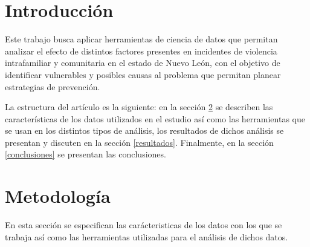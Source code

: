 \documentclass[final,5p,times]{elsarticle}
\begin{document}
\begin{frontmatter}
\begin{keyword}



\end{keyword}

\end{frontmatter}


\section{Introducci\'on} \label{intro}

Este trabajo busca aplicar herramientas de ciencia de datos que permitan analizar el efecto de distintos factores presentes en incidentes de violencia intrafamiliar y comunitaria en el estado de Nuevo Le\'on, con el objetivo de identificar vulnerables y posibles causas al problema que permitan planear estrategias de prevenci\'on.

La estructura del art\'iculo es la siguiente: en la secci\'on \ref{metodologia} se describen las caracter\'isticas de los datos utilizados en el estudio as\'i como las herramientas que se usan en los distintos tipos de an\'alisis, los resultados de dichos an\'alisis se presentan y discuten en la secci\'on \ref{resultados}. Finalmente, en la secci\'on \ref{conclusiones} se presentan las conclusiones.



\section{Metodolog\'ia} \label{metodologia}

En esta secci\'on se especifican las car\'acteristicas de los datos con los que se trabaja as\'i como las herramientas utilizadas para el an\'alisis de dichos datos. 
\end{document}
